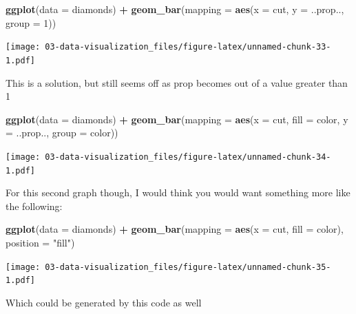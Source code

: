 \documentclass[]{book}
\newenvironment{Shaded}{\begin{snugshade}}{\end{snugshade}}
\newcommand{\DataTypeTok}[1]{\textcolor[rgb]{0.13,0.29,0.53}{#1}}
\newcommand{\DecValTok}[1]{\textcolor[rgb]{0.00,0.00,0.81}{#1}}
\newcommand{\KeywordTok}[1]{\textcolor[rgb]{0.13,0.29,0.53}{\textbf{#1}}}
\newcommand{\NormalTok}[1]{#1}
\newcommand{\OperatorTok}[1]{\textcolor[rgb]{0.81,0.36,0.00}{\textbf{#1}}}
\newcommand{\StringTok}[1]{\textcolor[rgb]{0.31,0.60,0.02}{#1}}
\theoremstyle{definition}
\theoremstyle{definition}
\theoremstyle{definition}
\theoremstyle{remark}
\begin{document}
\begin{Shaded}
\begin{Highlighting}[]
\KeywordTok{ggplot}\NormalTok{(}\DataTypeTok{data =}\NormalTok{ diamonds) }\OperatorTok{+}\StringTok{ }
\StringTok{  }\KeywordTok{geom_bar}\NormalTok{(}\DataTypeTok{mapping =} \KeywordTok{aes}\NormalTok{(}\DataTypeTok{x =}\NormalTok{ cut, }\DataTypeTok{y =}\NormalTok{ ..prop.., }\DataTypeTok{group =} \DecValTok{1}\NormalTok{))}
\end{Highlighting}
\end{Shaded}

\texttt{[image: 03-data-visualization\_files/figure-latex/unnamed-chunk-33-1.pdf]}

This is a solution, but still seems off as prop becomes out of a value
greater than 1

\begin{Shaded}
\begin{Highlighting}[]
\KeywordTok{ggplot}\NormalTok{(}\DataTypeTok{data =}\NormalTok{ diamonds) }\OperatorTok{+}\StringTok{ }
\StringTok{  }\KeywordTok{geom_bar}\NormalTok{(}\DataTypeTok{mapping =} \KeywordTok{aes}\NormalTok{(}\DataTypeTok{x =}\NormalTok{ cut, }\DataTypeTok{fill =}\NormalTok{ color, }\DataTypeTok{y =}\NormalTok{ ..prop.., }\DataTypeTok{group =}\NormalTok{ color))}
\end{Highlighting}
\end{Shaded}

\texttt{[image: 03-data-visualization\_files/figure-latex/unnamed-chunk-34-1.pdf]}

For this second graph though, I would think you would want something
more like the following:

\begin{Shaded}
\begin{Highlighting}[]
\KeywordTok{ggplot}\NormalTok{(}\DataTypeTok{data =}\NormalTok{ diamonds) }\OperatorTok{+}\StringTok{ }
\StringTok{  }\KeywordTok{geom_bar}\NormalTok{(}\DataTypeTok{mapping =} \KeywordTok{aes}\NormalTok{(}\DataTypeTok{x =}\NormalTok{ cut, }\DataTypeTok{fill =}\NormalTok{ color), }\DataTypeTok{position =} \StringTok{"fill"}\NormalTok{)}
\end{Highlighting}
\end{Shaded}

\texttt{[image: 03-data-visualization\_files/figure-latex/unnamed-chunk-35-1.pdf]}

Which could be generated by this code as well
\end{document}
